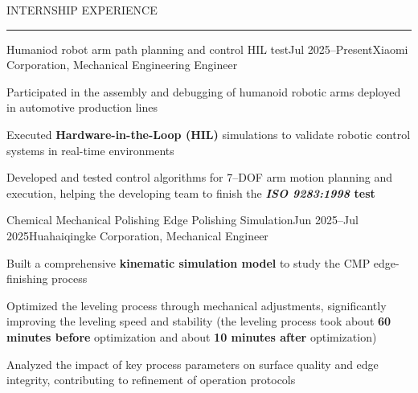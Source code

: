 \documentclass{resume} %
\renewenvironment{rSection}[1]{
\sectionskip
\textcolor{TsinghuaPurple}{\MakeUppercase{#1}}
\sectionlineskip
\hrule
\begin{list}{}{
\setlength{\leftmargin}{0em}
}
\item[]
}{
\end{list}
}
\begin{document}
\begin{rSection}{Internship Experience}
    
    \begin{rSubsection}{Humaniod robot arm path planning and control HIL test}{Jul 2025--Present}{Xiaomi Corporation, Mechanical Engineering Engineer}{}
        \item Participated in the assembly and debugging of humanoid robotic arms deployed in automotive production lines
        \item Executed \textbf{Hardware-in-the-Loop (HIL)} simulations to validate robotic control systems in real-time environments
        \item Developed and tested control algorithms for 7--DOF arm motion planning and execution, helping the developing team to finish the \textbf{\textit{ISO 9283:1998} test}
    \end{rSubsection}

    \begin{rSubsection}{Chemical Mechanical Polishing Edge Polishing Simulation}{Jun 2025--Jul 2025}{Huahaiqingke Corporation, Mechanical Engineer}{}
    \item Built a comprehensive \textbf{kinematic simulation model} to study the CMP edge-finishing process
    \item Optimized the leveling process through mechanical adjustments, significantly improving the leveling speed and stability (the leveling process took about \textbf{60 minutes before} optimization and about \textbf{10 minutes after} optimization)
    \item Analyzed the impact of key process parameters on surface quality and edge integrity, contributing to refinement of operation protocols
    \end{rSubsection}
    
\end{rSection}    


 
\end{document}
